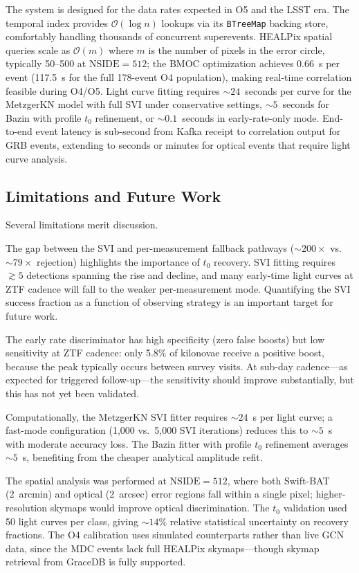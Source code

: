 \documentclass[twocolumn]{article}
\begin{document}
The system is designed for the data rates expected in O5 and the LSST era. The temporal index provides $\mathcal{O}(\log n)$ lookups via its \texttt{BTreeMap} backing store, comfortably handling thousands of concurrent superevents. HEALPix spatial queries scale as $\mathcal{O}(m)$ where $m$ is the number of pixels in the error circle, typically 50--500 at $\mathrm{NSIDE}=512$; the BMOC optimization achieves 0.66~s per event (117.5~s for the full 178-event O4 population), making real-time correlation feasible during O4/O5. Light curve fitting requires ${\sim}24$~seconds per curve for the MetzgerKN model with full SVI under conservative settings, ${\sim}5$~seconds for Bazin with profile $t_0$ refinement, or ${\sim}0.1$~seconds in early-rate-only mode. End-to-end event latency is sub-second from Kafka receipt to correlation output for GRB events, extending to seconds or minutes for optical events that require light curve analysis.

\subsection{Limitations and Future Work} \label{sec:future}

Several limitations merit discussion.

The gap between the SVI and per-measurement fallback pathways (${\sim}200\times$ vs.\ ${\sim}79\times$ rejection) highlights the importance of $t_0$ recovery. SVI fitting requires $\gtrsim 5$ detections spanning the rise and decline, and many early-time light curves at ZTF cadence will fall to the weaker per-measurement mode. Quantifying the SVI success fraction as a function of observing strategy is an important target for future work.

The early rate discriminator has high specificity (zero false boosts) but low sensitivity at ZTF cadence: only 5.8\% of kilonovae receive a positive boost, because the peak typically occurs between survey visits. At sub-day cadence---as expected for triggered follow-up---the sensitivity should improve substantially, but this has not yet been validated.

Computationally, the MetzgerKN SVI fitter requires ${\sim}24$~s per light curve; a fast-mode configuration (1,000 vs.\ 5,000 SVI iterations) reduces this to ${\sim}5$~s with moderate accuracy loss. The Bazin fitter with profile $t_0$ refinement averages ${\sim}5$~s, benefiting from the cheaper analytical amplitude refit.

The spatial analysis was performed at $\mathrm{NSIDE}=512$, where both Swift-BAT (2~arcmin) and optical (2~arcsec) error regions fall within a single pixel; higher-resolution skymaps would improve optical discrimination. The $t_0$ validation used 50 light curves per class, giving ${\sim}14\%$ relative statistical uncertainty on recovery fractions. The O4 calibration uses simulated counterparts rather than live GCN data, since the MDC events lack full HEALPix skymaps---though skymap retrieval from GraceDB is fully supported.
\end{document}
